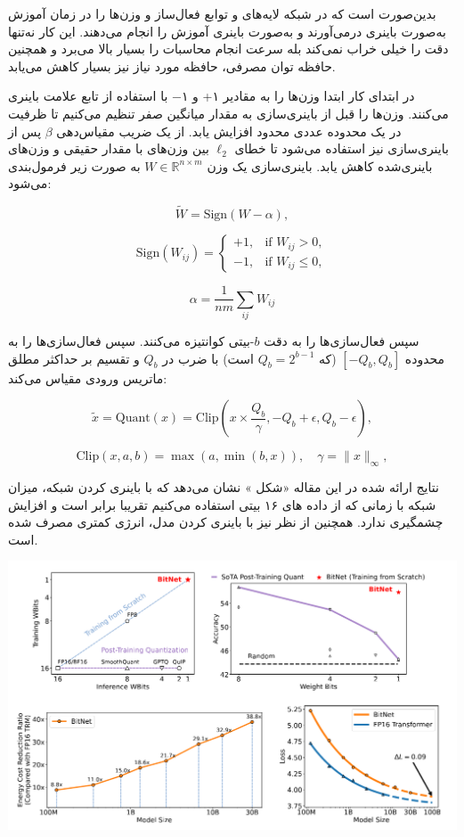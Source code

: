 \begin{qsolve}
	بدین‌صورت است که در شبکه  لایه‌های  و توابع فعال‌ساز و وزن‌ها را در زمان آموزش به‌صورت باینری درمی‌آورند و به‌صورت باینری آموزش را انجام می‌دهند. این کار نه‌تنها دقت را خیلی خراب نمی‌کند بله سرعت انجام محاسبات را بسیار بالا می‌برد و همچنین حافظه توان مصرفی، حافظه مورد نیاز نیز بسیار کاهش می‌یابد.
	
	در ابتدای کار ابتدا وزن‌ها را به مقادیر ۱+ و ۱− با استفاده از تابع علامت باینری می‌کنند. وزن‌ها را قبل از باینری‌سازی به مقدار میانگین صفر تنظیم می‌کنیم تا ظرفیت در یک محدوده عددی محدود افزایش یابد. از یک ضریب مقیاس‌دهی \(\beta\) پس از باینری‌سازی نیز استفاده می‌شود تا خطای \(\ell_2\) بین وزن‌های با مقدار حقیقی و وزن‌های باینری‌شده کاهش یابد. باینری‌سازی یک وزن \(W \in \mathbb{R}^{n \times m}\) به صورت زیر فرمول‌بندی می‌شود:
	
	\[
	\widetilde{W} = \text{Sign}(W - \alpha),
	\]
	
	\[
	\text{Sign}(W_{ij}) = \begin{cases} 
		+1, & \text{if } W_{ij} > 0, \\ 
		-1, & \text{if } W_{ij} \leq 0, 
	\end{cases}
	\]
	
	\[
	\alpha = \frac{1}{nm} \sum_{ij} W_{ij}
	\]
	
	
	سپس فعال‌سازی‌ها را به دقت \(b\)-بیتی کوانتیزه می‌کنند. سپس فعال‌سازی‌ها را به محدوده \([-Q_b, Q_b]\) (که \(Q_b = 2^{b-1}\) است) با ضرب در \(Q_b\) و تقسیم بر حداکثر مطلق ماتریس ورودی مقیاس می‌کند:
	
	\[
	\widetilde{x} = \text{Quant}(x) = \text{Clip}\left(x \times \frac{Q_b}{\gamma}, -Q_b + \epsilon, Q_b - \epsilon\right),
	\]
	
	\[
	\text{Clip}(x, a, b) = \max(a, \min(b, x)), \quad \gamma = \|x\|_{\infty},
	\]
	
	نتایج ارائه شده در این مقاله «شکل » نشان می‌دهد که با باینری کردن شبکه، میزان  شبکه با زمانی که از داده های 
	۱۶ بیتی استفاده می‌کنیم تقریبا برابر است و افزایش چشمگیری ندارد. همچنین از نظر  نیز با باینری کردن مدل، انرژی کمتری مصرف شده است.
	
	\begin{center}
		\includegraphics*[width=0.9\linewidth]{pics/img15.png}
		\label{ساخنتایجتار ارائه شده در ref1}
	\end{center}
\end{qsolve}

